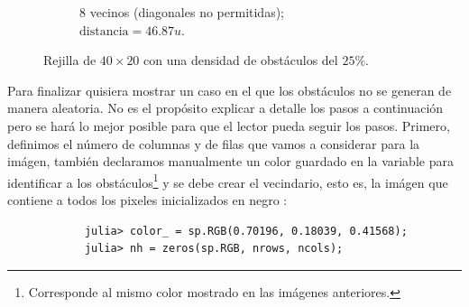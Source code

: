 \begin{enumerate}
\begin{solution}
\begin{figure}[ht!]
\begin{subfigure}{0.4\textwidth}
                \caption{8 vecinos (diagonales no permitidas); $\text{distancia} = 46.87 u$.}
            \end{subfigure}
            \caption{Rejilla de $40 \times 20$ con una densidad de obstáculos del $25\%$.}
            \label{fig:rejilla_40x20}
        \end{figure}

        Para finalizar quisiera mostrar un caso en el que los obstáculos no se generan de manera aleatoria. No es el propósito explicar a detalle los pasos a continuación pero se hará lo mejor posible para que el lector pueda seguir los pasos. Primero, definimos el número de columnas y de filas que vamos a considerar para la imágen, también declaramos manualmente un color guardado en la variable  para identificar a los obstáculos\footnote{Corresponde al mismo color mostrado en las imágenes anteriores.} y se debe crear el vecindario, esto es, la imágen que contiene a todos los pixeles inicializados en negro :
        \begin{verbatim}
            julia> color_ = sp.RGB(0.70196, 0.18039, 0.41568);
            julia> nh = zeros(sp.RGB, nrows, ncols);
        \end{verbatim}


\end{solution}
\end{enumerate}
